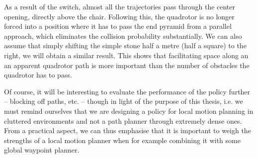 As a result of the switch, almost all the trajectories pass through the center opening, directly above the chair. Following this, the quadrotor is no longer forced into a position where it has to pass the end pyramid from a parallel approach, which eliminates the collision probability substantially. We can also assume that simply shifting the simple stone half a metre (half a square) to the right, we will obtain a similar result. This shows that facilitating space along an an apparent quadrotor path is more important than the number of obstacles the quadrotor has to pass. 

Of course, it will be interesting to evaluate the performance of the policy further -- blocking off paths, etc. -- though in light of the purpose of this thesis, i.e. we must remind ourselves that we are designing a policy for local motion planning in cluttered environments and not a path planner through extremely dense ones.
From a practical aspect, we can thus emphasise that it is important to weigh the strengths of a local motion planner when for example combining it with some global waypoint planner.  


